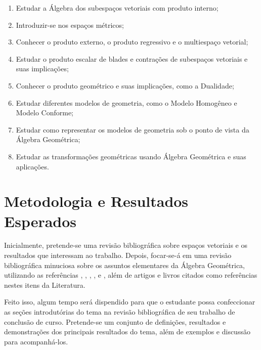 \documentclass[11pt]{article}
\begin{document}
\begin{enumerate}[(1)]

\item Estudar a Álgebra dos subespaços vetoriais com produto interno;

\item Introduzir-se nos espaços métricos;

\item Conhecer o produto externo, o produto regressivo e o multiespaço vetorial;

\item Estudar o produto escalar de blades e contrações de subespaços vetoriais e suas implicações;

\item Conhecer o produto geométrico e suas implicações, como a Dualidade;

\item Estudar diferentes modelos de geometria, como o Modelo Homogêneo e Modelo Conforme;

\item Estudar como representar os modelos de geometria sob o ponto de vista da Álgebra Geométrica;

\item Estudar as transformações geométricas usando Álgebra Geométrica e suas aplicações.

\end{enumerate}

\section{Metodologia e Resultados Esperados}
 
Inicialmente, pretende-se uma revisão bibliográfica sobre espaços vetoriais e os resultados que interessam ao trabalho. Depois, focar-se-á em uma revisão bibliográfica minuciosa sobre os assuntos elementares da Álgebra Geométrica, utilizando as referências \cite{leandro2017algebra}, , \cite{dorst2010geometric}, \cite{sommerGeometric}, \cite{lundholm2009clifford} e \cite{lounestoClifford}, além de artigos e livros citados como referências nestes itens da Literatura. 

Feito isso, algum tempo será dispendido para que o estudante possa confeccionar as seções introdutórias do tema na revisão bibliográfica de seu trabalho de conclusão de curso. Pretende-se um conjunto de definições, resultados e demonstrações dos principais resultados do tema, além de exemplos e discussão para acompanhá-los.
\\
\end{document}
